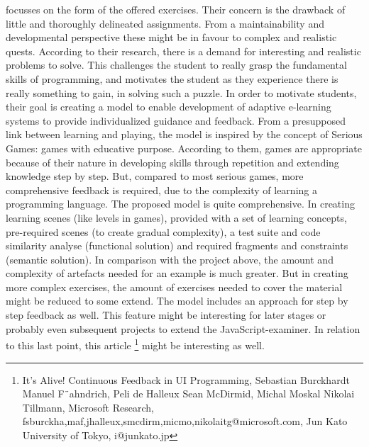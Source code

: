 \documentclass{article}
\begin{document}
focusses on the form of the offered exercises. Their concern is the 
drawback of little and  thoroughly delineated assignments. From a
maintainability and developmental perspective these might be in favour 
to complex and realistic quests. According to their research, there is a demand
for interesting and realistic problems to solve. This challenges the student to
really grasp the fundamental skills of programming, and motivates the student as
they experience there is really something to gain, in solving such a puzzle.
In order to motivate students, their goal is creating a model to enable 
development of adaptive e-learning systems to provide individualized guidance 
and feedback. From a presupposed link between learning and playing, the model
is inspired by the concept of Serious Games: games with educative purpose. 
According to them, games are appropriate because of their nature in developing
skills through repetition and extending knowledge step by step. But, 
compared to most serious games, more comprehensive feedback is 
required, due to the complexity of learning a programming language. The proposed
model is quite comprehensive.
In creating learning scenes (like levels in
games), provided with a set of learning concepts, pre-required scenes (to
create
gradual complexity), a test suite and code similarity analyse (functional 
solution) and
required fragments and constraints (semantic solution). In comparison with the 
project above, the amount and complexity of artefacts needed for an example is
much greater. But in creating more complex exercises, the amount of exercises 
needed to cover the material might be reduced to some extend. The model includes 
an approach for step by step feedback as well. This feature might be interesting 
for later stages or probably even subsequent projects to extend the 
JavaScript-examiner. In relation to this last point, this article
\footnote{It’s Alive! 
Continuous Feedback in UI Programming,
Sebastian Burckhardt Manuel F¨ahndrich,
Peli de Halleux Sean McDirmid,
Michal Moskal Nikolai Tillmann,
Microsoft Research,
fsburckha,maf,jhalleux,smcdirm,micmo,nikolaitg@microsoft.com,
Jun Kato
University of Tokyo,
i@junkato.jp}
might be interesting as well.
\end{document}
